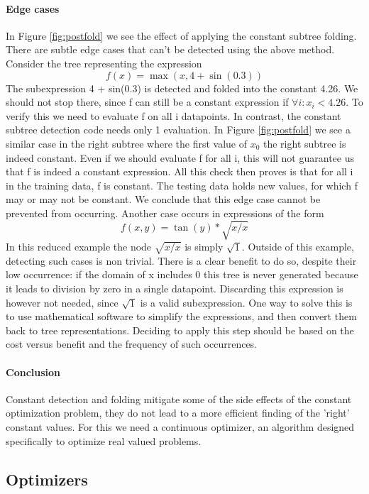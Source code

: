 \paragraph{Edge cases}
In Figure \ref{fig:postfold} we see the effect of applying the constant subtree folding. 
There are subtle edge cases that can't be detected using the above method. Consider the tree representing the expression
\[
f(x) = \max(x, 4 + \sin(0.3)) 
\]
The subexpression 4 + sin(0.3) is detected and folded into the constant 4.26. 
We should not stop there, since f can still be a constant expression if $\forall i :  x_i < 4.26$. To verify this we need to evaluate f on all i datapoints. In contrast, the constant subtree detection code needs only 1 evaluation. In Figure \ref{fig:postfold} we see a similar case in the right subtree where the first value of $x_0$ the right subtree is indeed constant. 
Even if we should evaluate f for all i, this will not guarantee us that f is indeed a constant expression. All this check then proves is that for all i in the training data, f is constant. The testing data holds new values, for which f may or may not be constant. We conclude that this edge case cannot be prevented from occurring.
Another case occurs in expressions of the form 
\[
f(x, y) = \tan(y) * \sqrt{x/x}
\]
In this reduced example the node $\sqrt{x/x}$ is simply $\sqrt{1}$. Outside of this example, detecting such cases is non trivial. There is a clear benefit to do so, despite their low occurrence: if the domain of x includes 0 this tree is never generated because it leads to division by zero in a single datapoint. Discarding this expression is however not needed, since $\sqrt{1}$ is a valid subexpression. One way to solve this is to use mathematical software to simplify the expressions, and then convert them back to tree representations. Deciding to apply this step should be based on the cost versus benefit and the frequency of such occurrences. 

\paragraph{Conclusion}
Constant detection and folding mitigate some of the side effects of the constant optimization problem, they do not lead to a more efficient finding of the 'right' constant values. For this we need a continuous optimizer, an algorithm designed specifically to optimize real valued problems.

\subsection{Optimizers}

